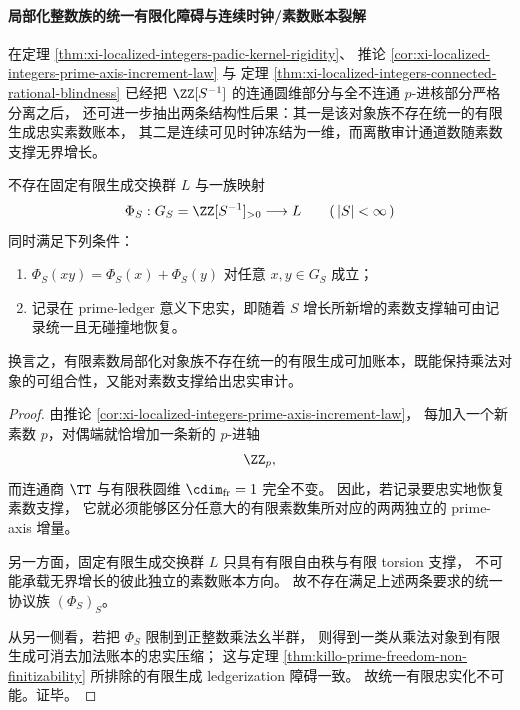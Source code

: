 \paragraph{局部化整数族的统一有限化障碍与连续时钟/素数账本裂解}
在定理 \ref{thm:xi-localized-integers-padic-kernel-rigidity}、
推论 \ref{cor:xi-localized-integers-prime-axis-increment-law} 与
定理 \ref{thm:xi-localized-integers-connected-rational-blindness} 已经把
\(\ZZ[S^{-1}]\) 的连通圆维部分与全不连通 \(p\)-进核部分严格分离之后，
还可进一步抽出两条结构性后果：其一是该对象族不存在统一的有限生成忠实素数账本，
其二是连续可见时钟冻结为一维，而离散审计通道数随素数支撑无界增长。

\begin{theorem}[素数账本的统一有限忠实化不可能性]\label{thm:xi-localized-integers-no-uniform-finitely-generated-ledger}
不存在固定有限生成交换群 \(L\) 与一族映射
\[
\Phi_S:G_S=\ZZ[S^{-1}]_{>0}\longrightarrow L
\qquad
(\,|S|<\infty\,)
\]
同时满足下列条件：
\begin{enumerate}
  \item \(\Phi_S(xy)=\Phi_S(x)+\Phi_S(y)\) 对任意 \(x,y\in G_S\) 成立；
  \item 记录在 prime-ledger 意义下忠实，即随着 \(S\) 增长所新增的素数支撑轴可由记录统一且无碰撞地恢复。
\end{enumerate}
换言之，有限素数局部化对象族不存在统一的有限生成可加账本，既能保持乘法对象的可组合性，又能对素数支撑给出忠实审计。
\end{theorem}
\begin{proof}
由推论 \ref{cor:xi-localized-integers-prime-axis-increment-law}，
每加入一个新素数 \(p\)，对偶端就恰增加一条新的 \(p\)-进轴
\[
\ZZ_p,
\]
而连通商 \(\TT\) 与有限秩圆维 \(\cdim_{\mathrm{fr}}=1\) 完全不变。
因此，若记录要忠实地恢复素数支撑，
它就必须能够区分任意大的有限素数集所对应的两两独立的 prime-axis 增量。

另一方面，固定有限生成交换群 \(L\) 只具有有限自由秩与有限 torsion 支撑，
不可能承载无界增长的彼此独立的素数账本方向。
故不存在满足上述两条要求的统一协议族 \((\Phi_S)_S\)。

从另一侧看，若把 \(\Phi_S\) 限制到正整数乘法幺半群，
则得到一类从乘法对象到有限生成可消去加法账本的忠实压缩；
这与定理 \ref{thm:killo-prime-freedom-non-finitizability} 所排除的有限生成 ledgerization 障碍一致。
故统一有限忠实化不可能。证毕。
\end{proof}

